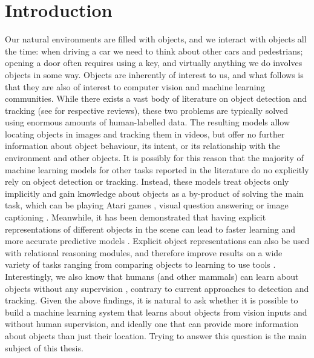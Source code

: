 \chapter{Introduction}
\label{ch:introduction}
%
	Our natural environments are filled with objects, and we interact with objects all the time: when driving a car we need to think about other cars and pedestrians; opening a door often requires using a key, and virtually anything we do involves objects in some way.
	Objects are inherently of interest to us, and what follows is that they are also of interest to computer vision and machine learning communities.
	While there exists a vast body of literature on object detection and tracking (see\eg \cite{Liu2018deepod,Ciaparrone2019deepmot} for respective reviews), these two problems are typically solved using enormous amounts of human-labelled data. 
	The resulting models allow locating objects in images and tracking them in videos, but offer no further information about object behaviour, its intent, or its relationship with the environment and other objects.
	It is possibly for this reason that the majority of machine learning models for other tasks reported in the literature do no explicitly rely on object detection or tracking.
	Instead, these models treat objects only implicitly and gain knowledge about objects as a by-product of solving the main task, which can be playing Atari games \citep{Mnih2013dqn}, visual question answering \citep{Malinowski2015vqn} or image captioning \citep{Xu2015show}.
	Meanwhile, it has been demonstrated that having explicit representations of different objects in the scene can lead to faster learning and more accurate predictive models \citep{Veerapaneni2019op3}. 
 	Explicit object representations can also be used with relational reasoning modules, and therefore improve results on a wide variety of tasks ranging from comparing objects \citep{Santoro2017} to learning to use tools \citep{Baker2019tooluse}.
 	Interestingly, we also know that humans (and other mammals) can learn about objects without any supervision \citep{Lambert2017cows}, contrary to current approaches to detection and tracking.
 	Given the above findings, it is natural to ask whether it is possible to build a machine learning system that learns about objects from vision inputs and without human supervision, and ideally one that can provide more information about objects than just their location.
 	Trying to answer this question is the main subject of this thesis.
 	
